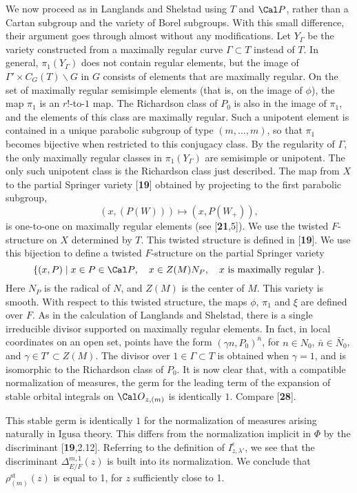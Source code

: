 We now proceed as in Langlands and Shelstad using $T$ and $\Cal P$, rather
than a Cartan subgroup and the variety of Borel subgroups.  With this small
difference, their argument goes through almost without any modifications.
Let $Y_\Gamma$ be the variety constructed from
a maximally regular curve $\Gamma\subset T$ instead of $T$.  In general,
$\pi_1(Y_\Gamma)$ does not contain regular elements, but the image of $\Gamma'\times C_G(T)\backslash G$
in $G$ consists of elements that are maximally regular.  On the set of maximally regular
semisimple elements (that is, on the image of $\phi$), 
the map $\pi_1$ is an $r!$-to-$1$ map.  The Richardson class
of $P_0$ is also in the image of $\pi_1$, and the elements of this class are 
maximally regular.  Such a
unipotent element is contained in a unique parabolic subgroup of type
$(m,\ldots,m)$, so that $\pi_1$ becomes bijective when restricted to this
conjugacy class.  By the regularity of $\Gamma$, the only maximally regular
classes in $\pi_1(Y_\Gamma)$ are semisimple or unipotent.  The only such unipotent class is
the Richardson class just described.  The map from $X$ to the partial
Springer variety [{\bf 19}] obtained by projecting to the first parabolic subgroup,
$$(x,(P(W))) \mapsto (x,P(W_+)),$$
is one-to-one on maximally regular elements (see [{\bf 21},5]).
We use the twisted $F$-structure
on $X$ determined by $T$. This twisted structure is defined in [{\bf 19}].  We use this bijection
to define a twisted $F$-structure on the partial Springer variety
$$\{(x,P)\mid x\in P\in{\Cal P}, \quad x \in Z(M)N_P,\quad x\text{ is maximally regular }\}.$$
Here $N_P$ is the radical of $N$, and $Z(M)$ is the center of $M$.
This variety is smooth.  With respect to this
twisted structure, the maps $\phi$, $\pi_1$ and $\xi$ are defined over $F$.
As in the calculation of Langlands and Shelstad, there
is a single irreducible divisor supported on maximally regular elements.
In fact, in local coordinates
on an open set,
points have the form $(\gamma n,P_0)^{\bar n}$, for $n\in N_0$, $\bar n\in \bar N_0$,
and $\gamma\in T'\subset Z(M)$.
%
The divisor over $1\in\Gamma\subset T$ is obtained when $\gamma=1$, and is
isomorphic to the Richardson class of $P_0$.  It is now clear that, with
a compatible
normalization of measures, the germ for the leading term of the expansion
of stable orbital integrals on ${\Cal O}_{z,(m)}$ is
identically $1$.  Compare [{\bf 28}].

This stable  germ is identically $1$ for the normalization of measures
arising naturally in Igusa theory.  This differs from the normalization
implicit in $\Phi$
by the discriminant [{\bf 19},2.12].  
Referring to the definition of $I^\epsilon_{z,\lambda'}$, we
see that the discriminant $\Delta^{m,1}_{E/F}(z)$ is built into
its normalization.
We conclude that
$\rho^{\text{st}}_{(m)}(z)$ is equal to 1,
for $z$ sufficiently close to 1.

